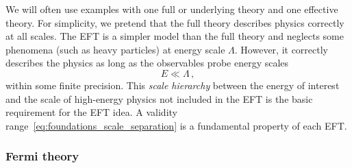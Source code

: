 We will often use examples with one full or underlying theory and
one effective theory. For simplicity, we pretend that the full theory
describes physics correctly at all scales. The EFT is a simpler model
than the full theory and neglects some phenomena (such as heavy
particles) at energy scale $\Lambda$. However, it correctly describes
the physics as long as the observables probe energy scales
%
\begin{equation}
  E \ll \Lambda \,,
  \label{eq:foundations_scale_separation}
\end{equation}
%
within some finite precision. This \emph{scale hierarchy} between the
energy of interest and the scale of high-energy physics not included
in the EFT is the basic requirement for the EFT idea. A validity
range~\eqref{eq:foundations_scale_separation} is a fundamental property of each
EFT.





\subsubsection{Fermi theory}

